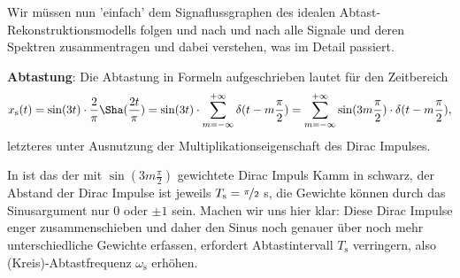 \begin{ExCalc}
Wir müssen nun 'einfach' dem Signaflussgraphen des idealen Abtast-Rekonstruktionsmodells
folgen und nach und nach alle Signale und deren Spektren zusammentragen und dabei
verstehen, was im Detail passiert.

\textbf{Abtastung}:
Die Abtastung in Formeln aufgeschrieben lautet für den Zeitbereich
\begin{equation}
x_\mathrm{s}(t) = \sin(3 t) \cdot \frac{2}{\pi} {\Sha}(\frac{2 t}{\pi}) =
\sin(3 t) \cdot \sum_{m=-\infty}^{+\infty} \delta(t-m \frac{\pi}{2})=
\sum_{m=-\infty}^{+\infty} \sin(3 m \frac{\pi}{2}) \cdot \delta(t-m \frac{\pi}{2}),
\end{equation}
letzteres unter Ausnutzung der Multiplikationseigenschaft des Dirac Impulses.

In  ist das der mit $\sin(3 m \frac{\pi}{2})$
gewichtete  Dirac Impuls Kamm in schwarz, der Abstand der Dirac Impulse ist jeweils
$T_\mathrm{s}=\nicefrac{\pi}{2}$ s,
die Gewichte können durch das Sinusargument nur $0$ oder $\pm 1$ sein.
Machen wir uns hier klar: Diese Dirac Impulse enger zusammenschieben und daher
den Sinus noch genauer über noch mehr unterschiedliche Gewichte erfassen, erfordert
Abtastintervall $T_\mathrm{s}$ verringern, also (Kreis)-Abtastfrequenz $\omega_\mathrm{s}$
erhöhen.


\end{ExCalc}
